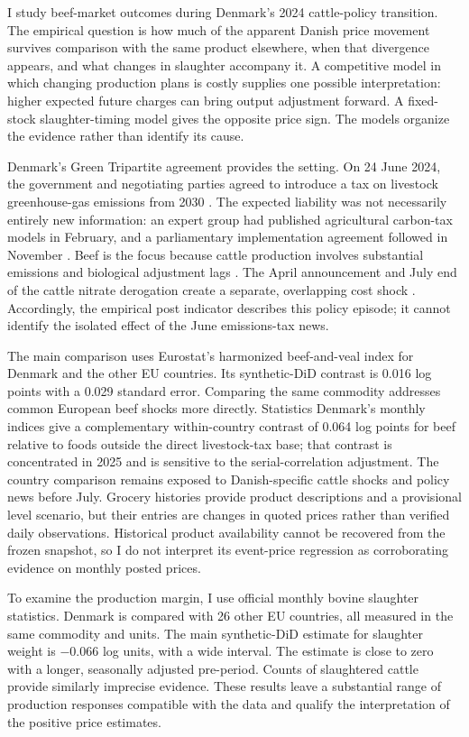 \documentclass[11pt]{article}
\begin{document}
I study beef-market outcomes during Denmark's 2024 cattle-policy transition. The empirical question is how much of the apparent Danish price movement survives comparison with the same product elsewhere, when that divergence appears, and what changes in slaughter accompany it. A competitive model in which changing production plans is costly supplies one possible interpretation: higher expected future charges can bring output adjustment forward. A fixed-stock slaughter-timing model gives the opposite price sign. The models organize the evidence rather than identify its cause.

Denmark's Green Tripartite agreement provides the setting. On 24 June 2024, the government and negotiating parties agreed to introduce a tax on livestock greenhouse-gas emissions from 2030 \citep{danishgovernment2024}. The expected liability was not necessarily entirely new information: an expert group had published agricultural carbon-tax models in February, and a parliamentary implementation agreement followed in November \citep{danishexpert2024,danishimplementation2024}. Beef is the focus because cattle production involves substantial emissions and biological adjustment lags \citep{rosen1994}. The April announcement and July end of the cattle nitrate derogation create a separate, overlapping cost shock \citep{danishnitrates2024}. Accordingly, the empirical post indicator describes this policy episode; it cannot identify the isolated effect of the June emissions-tax news.

The main comparison uses Eurostat's harmonized beef-and-veal index for Denmark and the other EU countries. Its synthetic-DiD contrast is 0.016 log points with a 0.029 standard error. Comparing the same commodity addresses common European beef shocks more directly. Statistics Denmark's monthly indices give a complementary within-country contrast of 0.064 log points for beef relative to foods outside the direct livestock-tax base; that contrast is concentrated in 2025 and is sensitive to the serial-correlation adjustment. The country comparison remains exposed to Danish-specific cattle shocks and policy news before July. Grocery histories provide product descriptions and a provisional level scenario, but their entries are changes in quoted prices rather than verified daily observations. Historical product availability cannot be recovered from the frozen snapshot, so I do not interpret its event-price regression as corroborating evidence on monthly posted prices.

To examine the production margin, I use official monthly bovine slaughter statistics. Denmark is compared with 26 other EU countries, all measured in the same commodity and units. The main synthetic-DiD estimate for slaughter weight is $-0.066$ log units, with a wide interval. The estimate is close to zero with a longer, seasonally adjusted pre-period. Counts of slaughtered cattle provide similarly imprecise evidence. These results leave a substantial range of production responses compatible with the data and qualify the interpretation of the positive price estimates.
\end{document}

